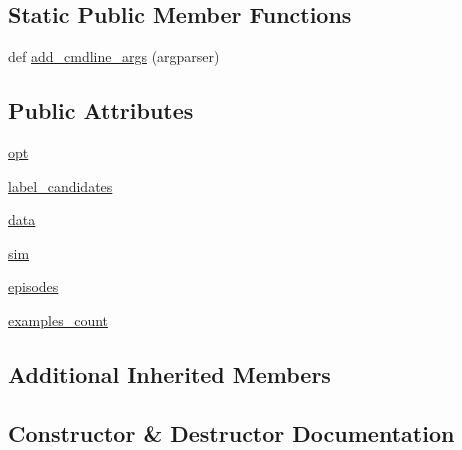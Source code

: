 \subsection*{Static Public Member Functions}
\begin{DoxyCompactItemize}
\item 
def \hyperlink{classparlai_1_1tasks_1_1talkthewalk_1_1base_1_1TTWBase_a58e285e5ba5843219867ad14512bde8a}{add\+\_\+cmdline\+\_\+args} (argparser)
\end{DoxyCompactItemize}
\subsection*{Public Attributes}
\begin{DoxyCompactItemize}
\item 
\hyperlink{classparlai_1_1tasks_1_1talkthewalk_1_1base_1_1TTWBase_aa716b1fde5dd6d0409ff111df962067e}{opt}
\item 
\hyperlink{classparlai_1_1tasks_1_1talkthewalk_1_1base_1_1TTWBase_a66874e232187d869705096b64775448e}{label\+\_\+candidates}
\item 
\hyperlink{classparlai_1_1tasks_1_1talkthewalk_1_1base_1_1TTWBase_a3080a626f294ef819e26aedb322ee99a}{data}
\item 
\hyperlink{classparlai_1_1tasks_1_1talkthewalk_1_1base_1_1TTWBase_a723ca7277cb3040cbfef0d9ef3161df3}{sim}
\item 
\hyperlink{classparlai_1_1tasks_1_1talkthewalk_1_1base_1_1TTWBase_a0c6f24b6c2fa6e69d28606ac2cabab01}{episodes}
\item 
\hyperlink{classparlai_1_1tasks_1_1talkthewalk_1_1base_1_1TTWBase_a6d2d68b1aba27c50ce67efc0c0f07dc4}{examples\+\_\+count}
\end{DoxyCompactItemize}
\subsection*{Additional Inherited Members}


\subsection{Constructor \& Destructor Documentation}
\mbox{\label{classparlai_1_1tasks_1_1talkthewalk_1_1base_1_1TTWBase_abde7fa2ca98467601795e5873285d8a0}} 
